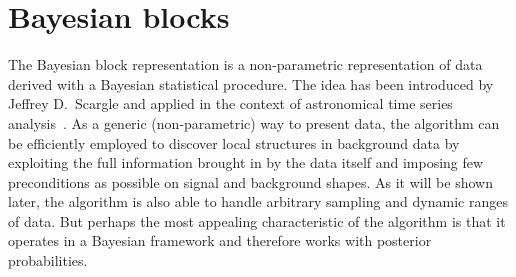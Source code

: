 
\chapter{Bayesian blocks}%
\label{apdx:bayesblocks}

The Bayesian block representation is a non-parametric representation of data derived with
a Bayesian statistical procedure. The idea has been introduced by Jeffrey D.~Scargle and
applied in the context of astronomical time series analysis~\cite{Scargle1997,
Scargle2012}. As a generic (non-parametric) way to present data, the algorithm can be
efficiently employed to discover local structures in background data by exploiting the
full information brought in by the data itself and imposing few preconditions as possible
on signal and background shapes. As it will be shown later, the algorithm is also able to
handle arbitrary sampling and dynamic ranges of data. But perhaps the most appealing
characteristic of the algorithm is that it operates in a Bayesian framework and therefore
works with posterior probabilities.

